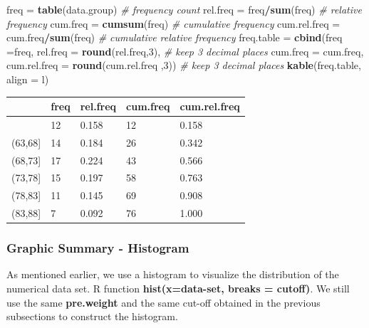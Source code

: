 \documentclass[
]{book}
\newenvironment{Shaded}{\begin{snugshade}}{\end{snugshade}}
\newcommand{\AttributeTok}[1]{\textcolor[rgb]{0.13,0.29,0.53}{#1}}
\newcommand{\CommentTok}[1]{\textcolor[rgb]{0.56,0.35,0.01}{\textit{#1}}}
\newcommand{\DecValTok}[1]{\textcolor[rgb]{0.00,0.00,0.81}{#1}}
\newcommand{\FunctionTok}[1]{\textcolor[rgb]{0.13,0.29,0.53}{\textbf{#1}}}
\newcommand{\NormalTok}[1]{#1}
\newcommand{\OtherTok}[1]{\textcolor[rgb]{0.56,0.35,0.01}{#1}}
\newcommand{\SpecialCharTok}[1]{\textcolor[rgb]{0.81,0.36,0.00}{\textbf{#1}}}
\newcommand{\StringTok}[1]{\textcolor[rgb]{0.31,0.60,0.02}{#1}}
\begin{document}
\begin{Shaded}
\begin{Highlighting}[]
\NormalTok{freq }\OtherTok{=} \FunctionTok{table}\NormalTok{(data.group)              }\CommentTok{\# frequency count}
\NormalTok{rel.freq }\OtherTok{=}\NormalTok{ freq}\SpecialCharTok{/}\FunctionTok{sum}\NormalTok{(freq)             }\CommentTok{\# relative frequency}
\NormalTok{cum.freq }\OtherTok{=} \FunctionTok{cumsum}\NormalTok{(freq)               }\CommentTok{\# cumulative frequency}
\NormalTok{cum.rel.freq }\OtherTok{=}\NormalTok{ cum.freq}\SpecialCharTok{/}\FunctionTok{sum}\NormalTok{(freq)     }\CommentTok{\# cumulative relative frequency}
\NormalTok{freq.table }\OtherTok{=} \FunctionTok{cbind}\NormalTok{(}\AttributeTok{freq =}\NormalTok{freq, }
                   \AttributeTok{rel.freq =} \FunctionTok{round}\NormalTok{(rel.freq,}\DecValTok{3}\NormalTok{),   }\CommentTok{\# keep 3 decimal places}
                   \AttributeTok{cum.freq =}\NormalTok{ cum.freq,}
                   \AttributeTok{cum.rel.freq =} \FunctionTok{round}\NormalTok{(cum.rel.freq ,}\DecValTok{3}\NormalTok{)) }\CommentTok{\# keep 3 decimal places}
\FunctionTok{kable}\NormalTok{(freq.table, }\AttributeTok{align =} \StringTok{\textquotesingle{}l\textquotesingle{}}\NormalTok{)}
\end{Highlighting}
\end{Shaded}

\begin{tabular}{l|l|l|l|l}
\hline
  & freq & rel.freq & cum.freq & cum.rel.freq\\
\hline
[58,63] & 12 & 0.158 & 12 & 0.158\\
\hline
(63,68] & 14 & 0.184 & 26 & 0.342\\
\hline
(68,73] & 17 & 0.224 & 43 & 0.566\\
\hline
(73,78] & 15 & 0.197 & 58 & 0.763\\
\hline
(78,83] & 11 & 0.145 & 69 & 0.908\\
\hline
(83,88] & 7 & 0.092 & 76 & 1.000\\
\hline
\end{tabular}

\hypertarget{graphic-summary---histogram}{%
\subsubsection{Graphic Summary - Histogram}\label{graphic-summary---histogram}}

As mentioned earlier, we use a histogram to visualize the distribution of the numerical data set. R function \textbf{hist(x=data-set, breaks = cutoff)}. We still use the same \textbf{pre.weight} and the same cut-off obtained in the previous subsections to construct the histogram.
\end{document}
